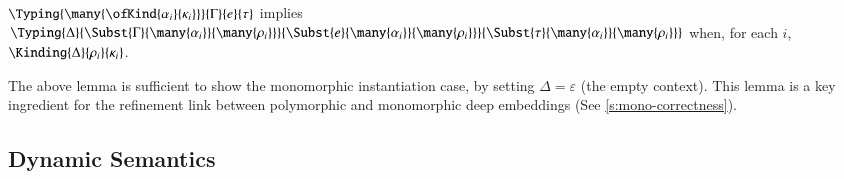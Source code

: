 \documentclass[9pt\ifFinal\else,preprint,nocopyrightspace\fi,\ifAlpha\else natbib,authoryear\fi]{sigplanconf}
\begin{document}
\begin{lemma}
\label{lemma:spec} 
$\Typing{\many{\ofKind{\alpha_i}{\kappa_i}}}{\Gamma}{e}{\tau}$
      implies $\Typing{\Delta}
                      {\Subst{\Gamma}{\many{\alpha_i}}{\many{\rho_i}}}
                      {\Subst{e}{\many{\alpha_i}}{\many{\rho_i}}}
                      {\Subst{\tau}{\many{\alpha_i}}{\many{\rho_i}}}
                      $ when, for each $i$, $\Kinding{\Delta}{\rho_i}{\kappa_i}$.
\end{lemma}
\noindent The above lemma is sufficient to show the monomorphic instantiation case, by setting $\Delta = \varepsilon$ (the empty context). This lemma is a
key ingredient for the refinement link between polymorphic and monomorphic deep embeddings (See \autoref{s:mono-correctness}).

\subsection{Dynamic Semantics}
\label{sec:dynsem}
\end{document}
